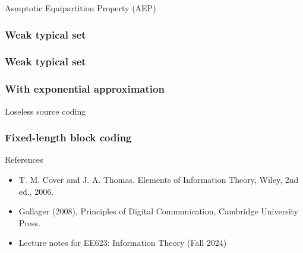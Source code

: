 \documentclass[9pt]{beamer}
\begin{document}
\begin{section}{Asmptotic Equipartition Property (AEP)}
        \begin{frame}
            \frametitle{Weak typical set}
            \begin{corollary}
                
            \end{corollary}

        
        \end{frame}  

        \begin{frame}
            \frametitle{Weak typical set}
            \begin{corollary}
                
            \end{corollary}

        
        \end{frame}  

        \begin{frame}
            \frametitle{With exponential approximation }
        
            
        
        \end{frame}
    \end{section}

    \begin{section}{Loseless source coding}
        
        \begin{frame}
            \frametitle{Fixed-length block coding}
        
            
        
        \end{frame}
    \end{section}

    \begin{frame}{References}
        \begin{itemize}
            \item T. M. Cover and J. A. Thomas. Elements of Information Theory, Wiley, 2nd ed., 2006.
            \item Gallager (2008), Principles of Digital Communication, Cambridge University Press.
            \item Lecture notes for EE623: Information Theory (Fall 2024)
        \end{itemize}
        \vspace{6cm}
    \end{frame}
\end{document}
